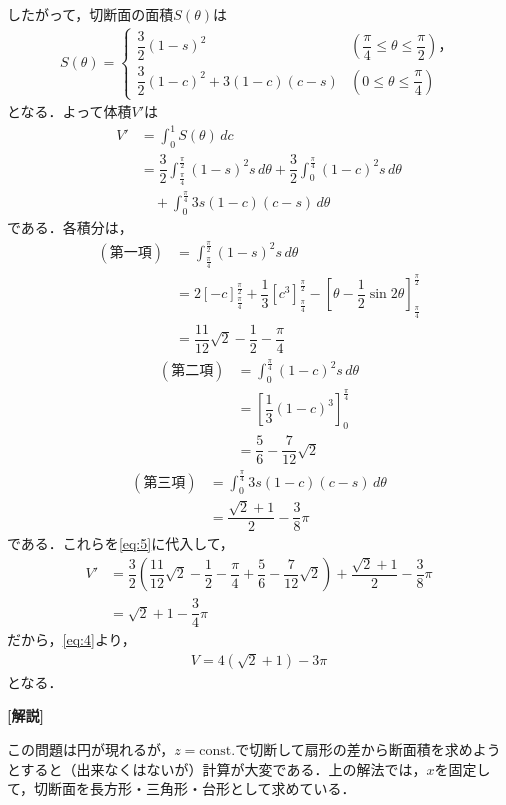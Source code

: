 \documentclass[../../main.tex]{subfiles}
\begin{document}
したがって，切断面の面積$S(\theta)$は
\begin{align}
  S(\theta)=
  \begin{cases}
    \dfrac{3}{2}(1-s)^2
    & \left(\dfrac{\pi}{4}\le\theta\le\dfrac{\pi}{2}\right)，\\
    \dfrac{3}{2}(1-c)^2+3(1-c)(c-s)
    & \left(0\le\theta\le\dfrac{\pi}{4}\right)
  \end{cases}
\end{align}
となる．よって体積$V'$は
\begin{align}
  V'&=\int_0^1 S(\theta)\,dc\\
  &=\dfrac{3}{2}\int_{\frac{\pi}{4}}^{\frac{\pi}{2}}(1-s)^2s\,d\theta
  +\dfrac{3}{2}\int_0^{\frac{\pi}{4}}(1-c)^2s\,d\theta\\
  &\quad+\int_0^{\frac{\pi}{4}}3s(1-c)(c-s)\,d\theta
  \label{eq:5}
\end{align}
である．各積分は，
\begin{align}
  (\text{第一項})
  &=\int_{\frac{\pi}{4}}^{\frac{\pi}{2}}(1-s)^2s\,d\theta \\
  &=2[-c]_{\frac{\pi}{4}}^{\frac{\pi}{2}}
  +\dfrac{1}{3}[c^3]_{\frac{\pi}{4}}^{\frac{\pi}{2}}
  -\left[\theta-\dfrac{1}{2}\sin2\theta\right]_{\frac{\pi}{4}}^{\frac{\pi}{2}}\\
  &=\dfrac{11}{12}\sqrt{2}-\dfrac{1}{2}-\dfrac{\pi}{4}
\end{align}
\begin{align}
  (\text{第二項})
  &=\int_0^{\frac{\pi}{4}}(1-c)^2s\,d\theta \\
  &=\left[\dfrac{1}{3}(1-c)^3\right]_0^{\frac{\pi}{4}} \\
  &=\dfrac{5}{6}-\dfrac{7}{12}\sqrt{2}
\end{align}
\begin{align}
  (\text{第三項})
  &=\int_0^{\frac{\pi}{4}}3s(1-c)(c-s)\,d\theta \\
  &=\dfrac{\sqrt{2}+1}{2}-\dfrac{3}{8}\pi
\end{align}
である．これらを\cref{eq:5}に代入して，
\begin{align}
  V'&=\dfrac{3}{2}\left(\dfrac{11}{12}\sqrt{2}-\dfrac{1}{2}-\dfrac{\pi}{4}
  +\dfrac{5}{6}-\dfrac{7}{12}\sqrt{2}\right)
  +\dfrac{\sqrt{2}+1}{2}-\dfrac{3}{8}\pi\\
  &=\sqrt{2}+1-\dfrac{3}{4}\pi
\end{align}
だから，\cref{eq:4}より，
\begin{align}
  V=4(\sqrt{2}+1)-3\pi
\end{align}
となる．

{\bf [解説]}

この問題は円が現れるが，$z=\text{const.}$で切断して扇形の差から断面積を求めようとすると（出来なくはないが）計算が大変である．上の解法では，$x$を固定して，切断面を長方形・三角形・台形として求めている．
\end{document}
